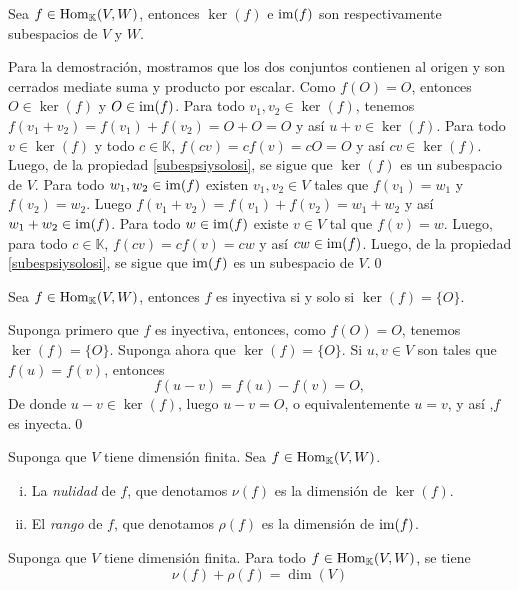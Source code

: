 \begin{prop}
Sea $f\in\operatorname{Hom}_{\mathbb{K}}(V,W)$, entonces $\ker(f)$ e $\operatorname{im}(f)$ son respectivamente subespacios de $V$ y $W$.
\end{prop}

\dem Para la demostración, mostramos que los dos conjuntos contienen al origen y son cerrados mediate suma y producto por escalar. Como $f(O)=O$, entonces $O\in\ker(f)$ y $O\in\operatorname{im}(f)$. Para todo $v_1,v_2\in \ker(f)$, tenemos $f(v_1+v_2)=f(v_1)+f(v_2)=O+O=O$ y  as\'i $u+v\in\ker(f)$. Para todo $v\in \ker(f)$ y todo $c\in \mathbb{K}$, $f(cv)=cf(v)=cO=O$ y as\'i $cv\in\ker(f)$. Luego, de la propiedad \ref{subespsiysolosi}, se sigue que $\ker(f)$ es un subespacio de $V$. Para todo $w_1,w_2\in \operatorname{im}(f)$ existen $v_1,v_2\in V$ tales que $f(v_1)=w_1$ y $f(v_2)=w_2$. Luego $f(v_1+v_2)=f(v_1)+f(v_2)=w_1+w_2$ y as\'i $w_1+w_2\in\operatorname{im}(f)$. Para todo $w\in\operatorname{im}(f)$ existe $v\in V$ tal que $f(v)=w$. Luego, para todo $c\in \mathbb{K}$, $f(cv)=cf(v)=cw$ y as\'i $cw\in\operatorname{im}(f)$. Luego, de la propiedad \ref{subespsiysolosi}, se sigue que $\operatorname{im}(f)$ es un subespacio de $V$.\qed

\begin{prop}\label{inyectiva}
Sea $f\in\operatorname{Hom}_{\mathbb{K}}(V,W)$, entonces $f$ es inyectiva si y solo si $\ker(f)=\{O\}$.
\end{prop}

\dem Suponga primero que $f$ es inyectiva, entonces, como $f(O)=O$, tenemos $\ker(f)=\{O\}$. Suponga ahora que $\ker(f)=\{O\}$. Si $u,v\in V$ son tales que $f(u)=f(v)$, entonces
\[
f(u-v)=f(u)-f(v)=O,
\]
De donde $u-v\in\ker(f)$, luego $u-v=O$, o equivalentemente $u=v$, y as\'i ,$f$ es inyecta.\qed

\begin{defn}
Suponga que $V$ tiene dimensi\'on finita. Sea $f\in\operatorname{Hom}_{\mathbb{K}}(V,W)$.
\begin{enumerate}[(i)]
\item La \emph{nulidad} de $f$, que denotamos $\nu(f)$ es la dimensi\'on de $\ker(f)$.
\item El \emph{rango} de $f$, que denotamos $\rho(f)$ es la dimensi\'on de $\operatorname{im}(f)$.
\end{enumerate}
\end{defn}

\begin{teo}\label{teorango}
Suponga que $V$ tiene dimensi\'on finita. Para todo $f\in\operatorname{Hom}_{\mathbb{K}}(V,W)$, se tiene
\[
\nu(f)+\rho(f)=\dim (V)
\]
\end{teo}

